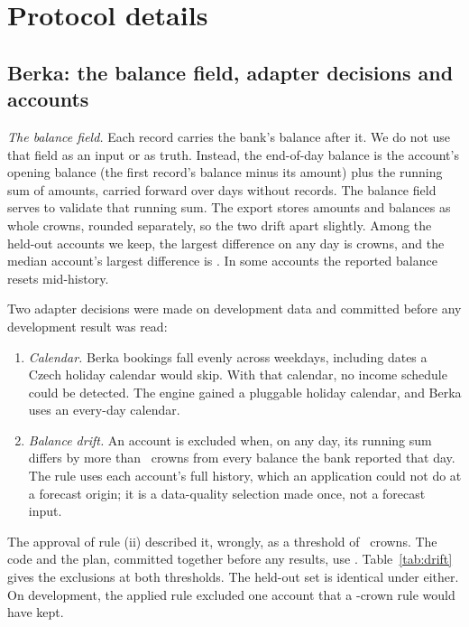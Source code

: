 \section{Protocol details}
\label{app:protocol}

\subsection{Berka: the balance field, adapter decisions and accounts}
\emph{The balance field.} Each record carries the bank's balance after it.
We do not use that field as an input or as truth. Instead, the end-of-day
balance is the account's opening balance (the first record's balance minus
its amount) plus the running sum of amounts, carried forward over days
without records. The balance field serves to validate that running sum.
The export stores amounts and balances as whole crowns, rounded
separately, so the two drift apart slightly. Among the held-out accounts
we keep, the largest difference on any day is 
crowns, and the median account's largest difference is
. In some accounts the reported
balance resets mid-history.

Two adapter decisions were made on development data and committed before
any development result was read:
\begin{enumerate}[label=(\roman*)]
\item \emph{Calendar.} Berka bookings fall evenly across weekdays,
  including dates a Czech holiday calendar would skip. With that calendar,
  no income schedule could be detected. The engine gained a pluggable
  holiday calendar, and Berka uses an every-day calendar.
\item \emph{Balance drift.} An account is excluded when, on any day, its
  running sum differs by more than ~crowns from every
  balance the bank reported that day. The rule uses each account's full
  history, which an application could not do at a forecast origin; it is a
  data-quality selection made once, not a forecast input.
\end{enumerate}
The approval of rule (ii) described it, wrongly, as a threshold of
~crowns. The code and the plan, committed together before any
results, use . Table~\ref{tab:drift} gives the exclusions at
both thresholds. The held-out set is identical under either. On
development, the applied rule excluded one account that a -crown
rule would have kept.

